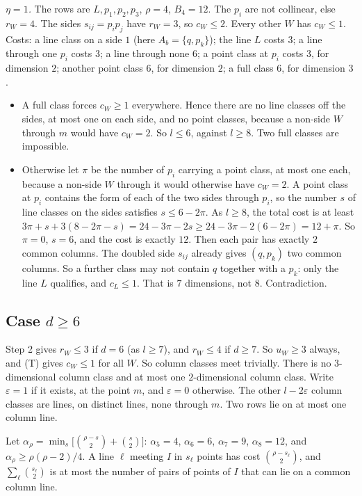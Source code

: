 \documentclass[11pt,a4paper]{article}
\theoremstyle{plain}
\theoremstyle{definition}
\begin{document}
\emph{$\eta=1$.} The rows are $L,p_{1},p_{2},p_{3}$, $\rho=4$, $B_{4}=12$. The $p_{i}$ are not collinear, else $r_{W}=4$. The sides $s_{ij}=p_{i}p_{j}$ have $r_{W}=3$, so $c_{W}\le2$. Every other $W$ has $c_{W}\le1$. Costs: a line class on a side $1$ (here $A_{b}=\{q,p_{k}\}$); the line $L$ costs $3$; a line through one $p_{i}$ costs $3$; a line through none $6$; a point class at $p_{i}$ costs $3$, for dimension $2$; another point class $6$, for dimension $2$; a full class $6$, for dimension $3$.
\begin{itemize}
\item A full class forces $c_{W}\ge1$ everywhere. Hence there are no line classes off the sides, at most one on each side, and no point classes, because a non-side $W$ through $m$ would have $c_{W}=2$. So $l\le6$, against $l\ge8$. Two full classes are impossible.
\item Otherwise let $\pi$ be the number of $p_{i}$ carrying a point class, at most one each, because a non-side $W$ through it would otherwise have $c_{W}=2$. A point class at $p_{i}$ contains the form of each of the two sides through $p_{i}$, so the number $s$ of line classes on the sides satisfies $s\le6-2\pi$. As $l\ge8$, the total cost is at least $3\pi+s+3(8-2\pi-s)=24-3\pi-2s\ge24-3\pi-2(6-2\pi)=12+\pi$. So $\pi=0$, $s=6$, and the cost is exactly $12$. Then each pair has exactly $2$ common columns. The doubled side $s_{ij}$ already gives $(q,p_{k})$ two common columns. So a further class may not contain $q$ together with a $p_{k}$: only the line $L$ qualifies, and $c_{L}\le1$. That is $7$ dimensions, not $8$. Contradiction.
\end{itemize}

\subsection{Case $d\ge6$}\label{sec:dsix}

Step 2 gives $r_{W}\le3$ if $d=6$ (as $l\ge7$), and $r_{W}\le4$ if $d\ge7$. So $u_{W}\ge3$ always, and (T) gives $c_{W}\le1$ for all $W$. So column classes meet trivially. There is no $3$-dimensional column class and at most one $2$-dimensional column class. Write $\varepsilon=1$ if it exists, at the point $m$, and $\varepsilon=0$ otherwise. The other $l-2\varepsilon$ column classes are lines, on distinct lines, none through $m$. Two rows lie on at most one column line.

Let $\alpha_{\rho}=\min_{s}\bigl[\binom{\rho-s}{2}+\binom{s}{2}\bigr]$: $\alpha_{5}=4$, $\alpha_{6}=6$, $\alpha_{7}=9$, $\alpha_{8}=12$, and $\alpha_{\rho}\ge\rho(\rho-2)/4$. A line $\ell$ meeting $I$ in $s_{\ell}$ points has cost $\binom{\rho-s_{\ell}}{2}$, and $\sum_{\ell}\binom{s_{\ell}}{2}$ is at most the number of pairs of points of $I$ that can lie on a common column line.
\end{document}
